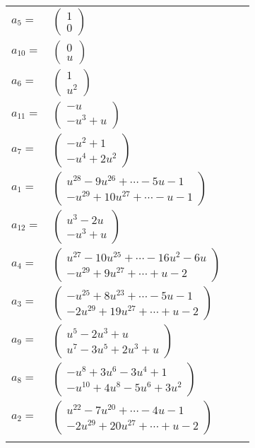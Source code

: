 \documentclass[1p]{elsarticle_modified}
\theoremstyle{definition}
\begin{document}
\begin{tabular}{m{7pt} m{180pt} m{7pt} m{180pt} }
\flushright $a_{5}=$&$\begin{pmatrix}1\\0\end{pmatrix}$ \\
\flushright $a_{10}=$&$\begin{pmatrix}0\\u\end{pmatrix}$ \\
\flushright $a_{6}=$&$\begin{pmatrix}1\\u^2\end{pmatrix}$ \\
\flushright $a_{11}=$&$\begin{pmatrix}- u\\- u^3+u\end{pmatrix}$ \\
\flushright $a_{7}=$&$\begin{pmatrix}- u^2+1\\- u^4+2 u^2\end{pmatrix}$ \\
\flushright $a_{1}=$&$\begin{pmatrix}u^{28}-9 u^{26}+\cdots-5 u-1\\- u^{29}+10 u^{27}+\cdots- u-1\end{pmatrix}$ \\
\flushright $a_{12}=$&$\begin{pmatrix}u^3-2 u\\- u^3+u\end{pmatrix}$ \\
\flushright $a_{4}=$&$\begin{pmatrix}u^{27}-10 u^{25}+\cdots-16 u^2-6 u\\- u^{29}+9 u^{27}+\cdots+u-2\end{pmatrix}$ \\
\flushright $a_{3}=$&$\begin{pmatrix}- u^{25}+8 u^{23}+\cdots-5 u-1\\-2 u^{29}+19 u^{27}+\cdots+u-2\end{pmatrix}$ \\
\flushright $a_{9}=$&$\begin{pmatrix}u^5-2 u^3+u\\u^7-3 u^5+2 u^3+u\end{pmatrix}$ \\
\flushright $a_{8}=$&$\begin{pmatrix}- u^8+3 u^6-3 u^4+1\\- u^{10}+4 u^8-5 u^6+3 u^2\end{pmatrix}$ \\
\flushright $a_{2}=$&$\begin{pmatrix}u^{22}-7 u^{20}+\cdots-4 u-1\\-2 u^{29}+20 u^{27}+\cdots+u-2\end{pmatrix}$\\&\end{tabular}
\end{document}
